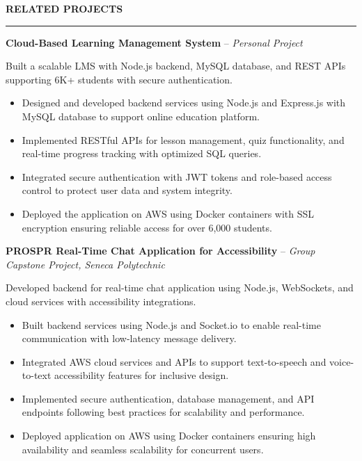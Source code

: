 \documentclass[10pt,letterpaper]{article}
\begin{document}
\vspace{6pt}

\textbf{RELATED PROJECTS}\\[-8pt]
\noindent\rule{\textwidth}{1pt}

\vspace{-2pt}

\textbf{Cloud-Based Learning Management System} -- \emph{Personal Project}

\vspace{-1pt}

Built a scalable LMS with Node.js backend, MySQL database, and REST APIs supporting 6K+ students with secure authentication.
\vspace{-1pt}
\begin{itemize}
\item Designed and developed backend services using Node.js and Express.js with MySQL database to support online education platform.
\item Implemented RESTful APIs for lesson management, quiz functionality, and real-time progress tracking with optimized SQL queries.
\item Integrated secure authentication with JWT tokens and role-based access control to protect user data and system integrity.
\item Deployed the application on AWS using Docker containers with SSL encryption ensuring reliable access for over 6,000 students.
\end{itemize}

\textbf{PROSPR  Real-Time Chat Application for Accessibility} -- \emph{Group Capstone Project, Seneca Polytechnic}

\vspace{-1pt}

Developed backend for real-time chat application using Node.js, WebSockets, and cloud services with accessibility integrations.
\vspace{-1pt}
\begin{itemize}
\item Built backend services using Node.js and Socket.io to enable real-time communication with low-latency message delivery.
\item Integrated AWS cloud services and APIs to support text-to-speech and voice-to-text accessibility features for inclusive design.
\item Implemented secure authentication, database management, and API endpoints following best practices for scalability and performance.
\item Deployed application on AWS using Docker containers ensuring high availability and seamless scalability for concurrent users.
\end{itemize}
\end{document}
